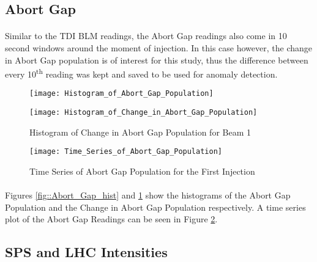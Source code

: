 \subsection{Abort Gap}
\paragraph{ }Similar to the \acs{TDI} \acs{BLM} readings, the Abort Gap readings also come in 10 second windows around the moment of injection. In this case however, the change in Abort Gap population is of interest for this study, thus the difference between every 10\textsuperscript{th} reading was kept and saved to be used for anomaly detection.

\begin{figure}[!t]
	\begin{minipage}[b]{0.475\linewidth}
		\centering
		\texttt{[image: Histogram\_of\_Abort\_Gap\_Population]}
		\caption[Abort Gap Histogram]{Histogram of Abort Gap Population for Beam 1}
		\label{fig::Abort_Gap_hist}
	\end{minipage}	
	\hspace{0.25cm}
	\begin{minipage}[b]{0.475\linewidth}
		\centering
		\texttt{[image: Histogram\_of\_Change\_in\_Abort\_Gap\_Population]}
		\caption[Change in Abort Gap Histogram]{Histogram of Change in Abort Gap Population for Beam 1}
		\label{fig::Change_in_Abort_Gap_hist}
	\end{minipage}	
\end{figure}

\begin{figure}[b]
	\centering
	\texttt{[image: Time\_Series\_of\_Abort\_Gap\_Population]}
	\caption[Abort Gap Time Series]{Time Series of Abort Gap  Population for the First Injection}
	\label{fig::Abort_Gap_Time_Series}
\end{figure}  


\paragraph{ }Figures \ref{fig::Abort_Gap_hist} and \ref{fig::Change_in_Abort_Gap_hist} show the histograms of the Abort Gap Population and the Change in Abort Gap Population respectively. A time series plot of the Abort Gap Readings can be seen in Figure \ref{fig::Abort_Gap_Time_Series}.

\subsection{\acs{SPS} and \acs{LHC} Intensities}
